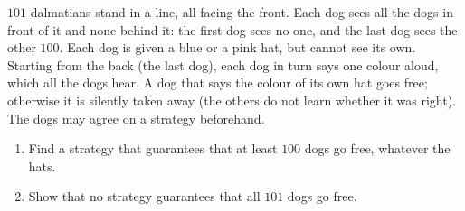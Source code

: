 $101$ dalmatians stand in a line, all facing the front. Each dog sees all the dogs in front of it and none behind it: the first dog sees no one, and the last dog sees the other $100$. Each dog is given a blue or a pink hat, but cannot see its own. Starting from the back (the last dog), each dog in turn says one colour aloud, which all the dogs hear. A dog that says the colour of its own hat goes free; otherwise it is silently taken away (the others do not learn whether it was right). The dogs may agree on a strategy beforehand.
\begin{enumerate}
\item[(a)] Find a strategy that guarantees that at least $100$ dogs go free, whatever the hats.
\item[(b)] Show that no strategy guarantees that all $101$ dogs go free.
\end{enumerate}
